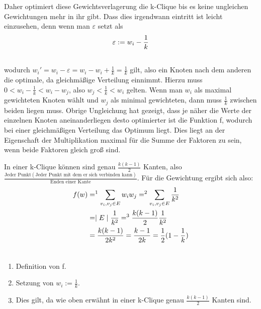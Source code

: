 \documentclass[12pt, a4paper]{article}
\begin{document}
Daher optimiert diese Gewichtsverlagerung die k-Clique bis es keine ungleichen Gewichtungen mehr in ihr gibt.
Dass dies irgendwann eintritt ist leicht einzusehen, denn wenn man $\varepsilon$ setzt als
\begin{gather}
\begin{split}\varepsilon := w_i - \frac{1}{k}\end{split}\notag\\\begin{split}\end{split}\notag
\end{gather}
wodurch $w_i' = w_i - \varepsilon = w_i - w_i + \frac{1}{k} = \frac{1}{k}$ gilt, also ein Knoten nach dem anderen die optimale, da gleichmäßige Verteilung einnimmt. Hierzu muss $0 < w_i - \frac{1}{k} < w_i - w_j$, also $w_j < \frac{1}{k} < w_i$ gelten. Wenn man $w_i$ als maximal gewichteten Knoten wählt und $w_j$ als minimal gewichteten, dann muss $\frac{1}{k}$ zwischen beiden liegen muss. Obrige Ungleichung hat gezeigt, dass je näher die Werte der einzelnen Knoten aneinanderliegen desto optimierter ist die Funktion f, wodurch bei einer gleichmäßigen Verteilung das Optimum liegt. Dies liegt an der Eigenschaft der Multiplikation maximal für die Summe der Faktoren zu sein, wenn beide Faktoren gleich groß sind.

In einer k-Clique können sind genau $\frac{k (k-1)}{2}$ Kanten, also \\
 $\frac{\text{Jeder Punkt} (\text{Jeder Punkt mit dem er sich verbinden kann})}{\text{Enden einer Kante}}$. Für die Gewichtung ergibt sich also:
\begin{gather}
\begin{split}f(w) &=^1 \sum_{v_i, v_j \in E} w_i w_j =^2 \sum_{v_i, v_j \in E} \frac{1}{k^2}  \\
&= \mid E \mid \frac{1}{k^2} =^3 \frac{k (k-1)}{2} \frac{1}{k^2}  \\
&= \frac{k (k-1)}{2k^2} = \frac{k-1}{2k} = \frac{1}{2} (1 - \frac{1}{k})\end{split}\notag\\\begin{split}\end{split}\notag
\end{gather}\begin{enumerate}
\item {}
Definition von f.

\item {}
Setzung von $w_i := \frac{1}{k}$.

\item {}
Dies gilt, da wie oben erwähnt in einer k-Clique genau $\frac{k (k-1)}{2}$ Kanten sind.

\end{enumerate}
\end{document}
